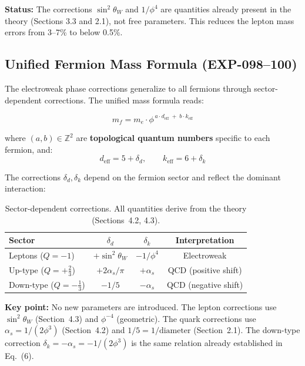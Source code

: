 \documentclass[12pt,a4paper]{article}
\begin{document}
\textbf{Status:} The corrections $\sin^2\theta_W$ and $1/\phi^4$ are quantities already present in the theory (Sections 3.3 and 2.1), not free parameters. This reduces the lepton mass errors from 3--7\% to below 0.5\%.

\subsection{Unified Fermion Mass Formula (EXP-098--100)}

The electroweak phase corrections generalize to all fermions through sector-dependent corrections. The unified mass formula reads:

\begin{equation}
\boxed{m_f = m_e \cdot \phi^{\,a \cdot d_{\text{eff}} \;+\; b \cdot k_{\text{eff}}}}
\end{equation}

where $(a,b) \in \mathbb{Z}^2$ are \textbf{topological quantum numbers} specific to each fermion, and:
\begin{equation}
d_{\text{eff}} = 5 + \delta_d, \qquad k_{\text{eff}} = 6 + \delta_k
\end{equation}

The corrections $\delta_d, \delta_k$ depend on the fermion sector and reflect the dominant interaction:

\begin{table}[H]
\centering
\begin{tabular}{lccc}
\toprule
\textbf{Sector} & $\delta_d$ & $\delta_k$ & \textbf{Interpretation} \\
\midrule
Leptons ($Q=-1$) & $+\sin^2\theta_W$ & $-1/\phi^4$ & Electroweak \\
Up-type ($Q=+\tfrac{2}{3}$) & $+2\alpha_s/\pi$ & $+\alpha_s$ & QCD (positive shift) \\
Down-type ($Q=-\tfrac{1}{3}$) & $-1/5$ & $-\alpha_s$ & QCD (negative shift) \\
\bottomrule
\end{tabular}
\caption{Sector-dependent corrections. All quantities derive from the theory (Sections~4.2, 4.3).}
\end{table}

\textbf{Key point:} No new parameters are introduced. The lepton corrections use $\sin^2\theta_W$ (Section~4.3) and $\phi^{-4}$ (geometric). The quark corrections use $\alpha_s = 1/(2\phi^3)$ (Section~4.2) and $1/5 = 1/\text{diameter}$ (Section~2.1). The down-type correction $\delta_k = -\alpha_s = -1/(2\phi^3)$ is the same relation already established in Eq.~(6).
\end{document}
